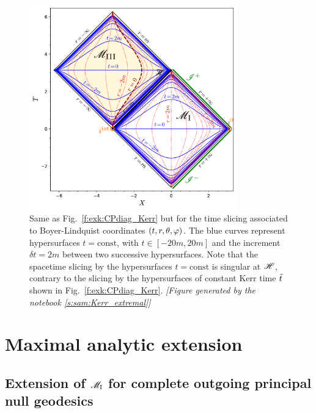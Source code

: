 \begin{figure}
\centerline{\includegraphics[width=0.8\textwidth]{exk_CPdiag_BL.pdf}}
\caption[]{\label{f:exk:CPdiag_BL} \footnotesize
Same as Fig.~\ref{f:exk:CPdiag_Kerr} but for the
time slicing associated to Boyer-Lindquist coordinates $(t,r,\theta,\varphi)$.
The blue curves represent hypersurfaces $t=\mathrm{const}$, with
$t\in[-20 m, 20 m]$ and
the increment $\delta t = 2 m$ between two successive hypersurfaces.
Note that the spacetime slicing by the hypersurfaces $t=\mathrm{const}$
is singular at $\mathscr{H}$, contrary to the slicing by the hypersurfaces
of constant Kerr time ${\tilde t}$ shown in Fig.~\ref{f:exk:CPdiag_Kerr}.
\textsl{[Figure generated by the notebook \ref{s:sam:Kerr_extremal}]}
}
\end{figure}


\section{Maximal analytic extension}

\subsection{Extension of $\mathscr{M}_{\rm I}$ for complete outgoing principal null geodesics}

